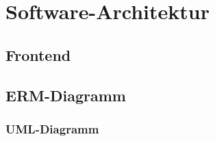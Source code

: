 \chapter{Software-Architektur}

\section{Frontend}


\section{ERM-Diagramm}


\subsection{UML-Diagramm}

